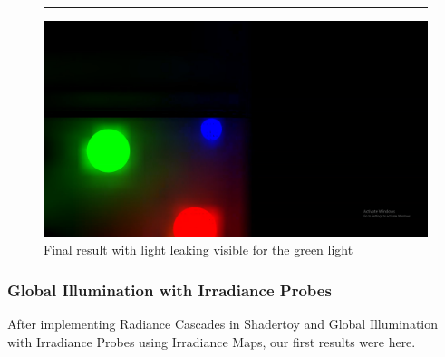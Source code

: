 \documentclass{rapportCS}
\begin{document}
\begin{figure}
\centering
\rule{1cm}{1cm}
\includegraphics[width=1\linewidth]{figures/shadertoy/shadertoy_final_leaks.png}
\caption{Final result with light leaking visible for the green light}
\end{figure}

\subsubsection{Global Illumination with Irradiance Probes}
After implementing Radiance Cascades in Shadertoy and Global Illumination with Irradiance Probes using Irradiance Maps, our first results were here. 
\end{document}
